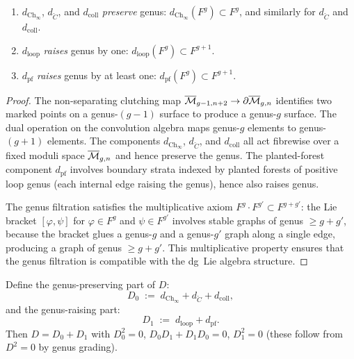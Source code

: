 \begin{lemma}
\ClaimStatusProvedElsewhere
\begin{enumerate}[label=\textup{(\roman*)}]
\item $d_{\mathrm{Ch}_\infty}$, $d_{\check{C}}$, and
 $d_{\mathrm{coll}}$ \emph{preserve} genus:
 $d_{\mathrm{Ch}_\infty}(F^g) \subset F^g$,
 and similarly for $d_{\check{C}}$ and $d_{\mathrm{coll}}$.
\item $d_{\mathrm{loop}}$ \emph{raises} genus by one:
 $d_{\mathrm{loop}}(F^g) \subset F^{g+1}$.
\item $d_{\mathrm{pf}}$ \emph{raises} genus by at least one:
 $d_{\mathrm{pf}}(F^g) \subset F^{g+1}$.
\end{enumerate}
\end{lemma}

\begin{proof}
The non-separating clutching map
$\overline{\mathcal{M}}_{g-1,n+2} \to \partial\overline{\mathcal{M}}_{g,n}$
identifies two marked points on a genus-$(g{-}1)$ surface to
produce a genus-$g$ surface. The dual operation on the
convolution algebra maps genus-$g$ elements to genus-$(g{+}1)$
elements. The components $d_{\mathrm{Ch}_\infty}$,
$d_{\check{C}}$, and $d_{\mathrm{coll}}$ all act fibrewise over
a fixed moduli space $\overline{\mathcal{M}}_{g,n}$ and hence preserve
the genus. The planted-forest component $d_{\mathrm{pf}}$
involves boundary strata indexed by planted forests of positive
loop genus (each internal edge raising the genus), hence also
raises genus.

The genus filtration satisfies the multiplicative axiom
$F^g \cdot F^{g'} \subset F^{g+g'}$: the Lie bracket
$[\varphi, \psi]$ for $\varphi \in F^g$ and $\psi \in F^{g'}$
involves stable graphs of genus $\geq g + g'$, because the
bracket glues a genus-$g$ and a genus-$g'$ graph along a
single edge, producing a graph of genus $\geq g + g'$.
This multiplicative property ensures that the genus filtration
is compatible with the dg~Lie algebra structure.
\end{proof}

\begin{definition}
Define the genus-preserving part of $D$:
\begin{equation}%
D_0
\;:=\;
d_{\mathrm{Ch}_\infty}
+ d_{\check{C}}
+ d_{\mathrm{coll}},
\end{equation}
and the genus-raising part:
\begin{equation}%
D_1
\;:=\;
d_{\mathrm{loop}}
+ d_{\mathrm{pf}}.
\end{equation}
Then $D = D_0 + D_1$ with $D_0^2 = 0$,
$D_0 D_1 + D_1 D_0 = 0$, $D_1^2 = 0$
(these follow from $D^2 = 0$ by genus grading).
\end{definition}

